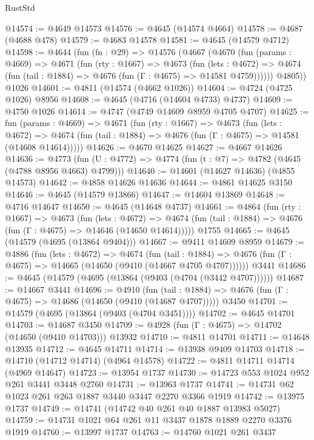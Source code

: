 \begin{lexlean}{RustStd}
\begin{coremodule}
@14574 := @4649 @14573
@14576 := @4645 (@14574 @4664)
@14578 := @4687 (@4688 @478)
@14579 := @4683 @14578
@14581 := @4645 (@14579 @4712)
@14598 := @4644
    (fun (fn : @29) =>
    @14576
      (@4667
        (@4670
          (fun (params : @4669) =>
          @4671
            (fun (rty : @1667) =>
            @4673
              (fun (lets : @4672) =>
              @4674 (fun (tail : @1884) => @4676 (fun (Γ : @4675) => @14581 @4759))))))
        @4805))
    @1026
@14601 := @4811 (@14574 (@4662 @1026))
@14604 := @4724 (@4725 @1026) @8956
@14608 := @4645 (@4716 (@14604 @4733) @4737)
@14609 := @4750 @1026
@14614 := @4747 (@4749 @14609 @8959 @4705 @4707)
@14625 := fun (params : @4669) =>
  @4671
    (fun (rty : @1667) =>
    @4673
      (fun (lets : @4672) =>
      @4674 (fun (tail : @1884) => @4676 (fun (Γ : @4675) => @14581 (@14608 @14614)))))
@14626 := @4670 @14625
@14627 := @4667 @14626
@14636 := @4773 (fun (U : @4772) => @4774 (fun (t : @7) => @4782 (@4645 (@4788 @8956 @4663) @4799)))
@14640 := @14601 (@14627 @14636) (@4855 @14573)
@14642 := @4858 @14626 @14636
@14644 := @4861 @14625 @3150
@14646 := @4645 (@14579 @13866)
@14647 := @14604 @13869
@14648 := @4716 @14647
@14650 := @4645 (@14648 @4737)
@14661 := @4864
    (fun (rty : @1667) =>
    @4673
      (fun (lets : @4672) =>
      @4674 (fun (tail : @1884) => @4676 (fun (Γ : @4675) => @14646 (@14650 @14614)))))
    @1755
@14665 := @4645 (@14579 (@4695 (@13864 @9404)))
@14667 := @9411 @14609 @8959
@14679 := @4886
    (fun (lets : @4672) =>
    @4674
      (fun (tail : @1884) =>
      @4676 (fun (Γ : @4675) => @14665 (@14650 (@9410 (@14667 @4705 @4707))))))
    @3441
@14686 := @4645 (@14579 (@4695 (@13864 (@9403 (@4704 (@3442 @4707))))))
@14687 := @14667 @3441
@14696 := @4910
    (fun (tail : @1884) => @4676 (fun (Γ : @4675) => @14686 (@14650 (@9410 (@14687 @4707)))))
    @3450
@14701 := @14579 (@4695 (@13864 (@9403 (@4704 @3451))))
@14702 := @4645 @14701
@14703 := @14687 @3450
@14709 := @4928 (fun (Γ : @4675) => @14702 (@14650 (@9410 @14703))) @13932
@14710 := @4811 @14701
@14711 := @14648 @13935
@14712 := @4645 @14711
@14714 := @13938 @9409 @14703
@14718 := @14710 (@14712 @14714) (@4964 @14578)
@14722 := @4811 @14711 @14714 (@4969 @14647)
@14723 := @13954 @1737
@14730 := @14723 @553 @1024 @952 @261 @3441 @3448 @2760
@14731 := @13963 @1737
@14741 := @14731 @62 @1023 @261 @263 @1887 @3440 @3447 @2270 @3366 @1919
@14742 := @13975 @1737
@14749 := @14741 (@14742 @40 @261 @40 @1887 @13983 @5027)
@14759 := @14731 @1021 @64 @261 @11 @3437 @1878 @1889 @2270 @3376 @1919
@14760 := @13997 @1737
@14763 := @14760 @1021 @261 @3437

\end{coremodule}
\end{lexlean}

